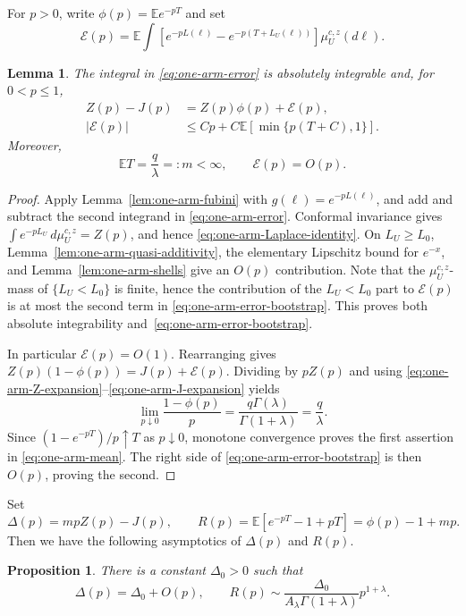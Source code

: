 \documentclass[11pt]{article}
\numberwithin{equation}{section}
\newcommand{\E}{\mathbb{E}}
\newcommand{\1}{\mathbf{1}}
\newtheorem{lemma}[theorem]{Lemma}
\newtheorem{proposition}[theorem]{Proposition}
\begin{document}
For \(p>0\), write \(\phi(p)=\E e^{-pT}\) and set
\begin{equation}\label{eq:one-arm-error}
 \mathcal E(p)=\E\!\int
 \left[e^{-pL(\ell)}-e^{-p(T+L_U(\ell))}\right]
 \mu_U^{c,z}(d\ell).
\end{equation}

\begin{lemma}
\label{lem:one-arm-bootstrap}
The integral in \eqref{eq:one-arm-error} is absolutely integrable and, for
\(0<p\le1\),
\begin{align}
 Z(p)-J(p)&=Z(p)\phi(p)+\mathcal E(p),
 \label{eq:one-arm-Laplace-identity}\\
 |\mathcal E(p)|&\le Cp+C\E[\min\{p(T+C),1\}].
 \label{eq:one-arm-error-bootstrap}
\end{align}
Moreover,
\begin{equation}\label{eq:one-arm-mean}
 \E T=\frac q\lambda=:m<\infty,
 \qquad \mathcal E(p)=O(p).
\end{equation}
\end{lemma}

\begin{proof}
Apply Lemma~\ref{lem:one-arm-fubini} with
\(g(\ell)=e^{-pL(\ell)}\), and add and subtract the second integrand in
\eqref{eq:one-arm-error}.  Conformal invariance gives
\(\int e^{-pL_U}\,d\mu_U^{c,z}=Z(p)\), and hence
\eqref{eq:one-arm-Laplace-identity}.  On \(L_U\ge L_0\),
Lemma~\ref{lem:one-arm-quasi-additivity}, the elementary Lipschitz bound for
\(e^{-x}\), and Lemma~\ref{lem:one-arm-shells} give an \(O(p)\) contribution.
Note that the $\mu_U^{c,z}$-mass of \(\{L_U<L_0\}\) is
finite, hence the contribution of the $L_U<L_0$ part to $\mathcal{E}(p)$ is at most the second term in
\eqref{eq:one-arm-error-bootstrap}.  This proves both absolute
integrability and~\eqref{eq:one-arm-error-bootstrap}.

In particular \(\mathcal E(p)=O(1)\).  Rearranging gives
\(Z(p)(1-\phi(p))=J(p)+\mathcal E(p)\).  Dividing by \(pZ(p)\) and using
\eqref{eq:one-arm-Z-expansion}--\eqref{eq:one-arm-J-expansion} yields
\[
 \lim_{p\downarrow0}\frac{1-\phi(p)}p
 =\frac{q\Gamma(\lambda)}{\Gamma(1+\lambda)}=\frac q\lambda.
\]
Since \((1-e^{-pT})/p\uparrow T\) as \(p\downarrow0\), monotone
convergence proves the first assertion in \eqref{eq:one-arm-mean}.  The
right side of \eqref{eq:one-arm-error-bootstrap} is then \(O(p)\), proving
the second.  \end{proof}

Set
\begin{equation}\label{eq:one-arm-Delta-R}
 \Delta(p)=mpZ(p)-J(p),\qquad
 R(p)=\E[e^{-pT}-1+pT]=\phi(p)-1+mp.
\end{equation}
Then we have the following asymptotics of \(\Delta(p)\) and \(R(p)\).
\begin{proposition}
\label{prop:one-arm-positive-defect}
There is a constant \(\Delta_0>0\) such that
\begin{equation}\label{eq:one-arm-R-asymptotic}
 \Delta(p)=\Delta_0+O(p),\qquad
 R(p)\sim\frac{\Delta_0}{A_\lambda\Gamma(1+\lambda)}p^{1+\lambda}.
\end{equation}
\end{proposition}
\end{document}
